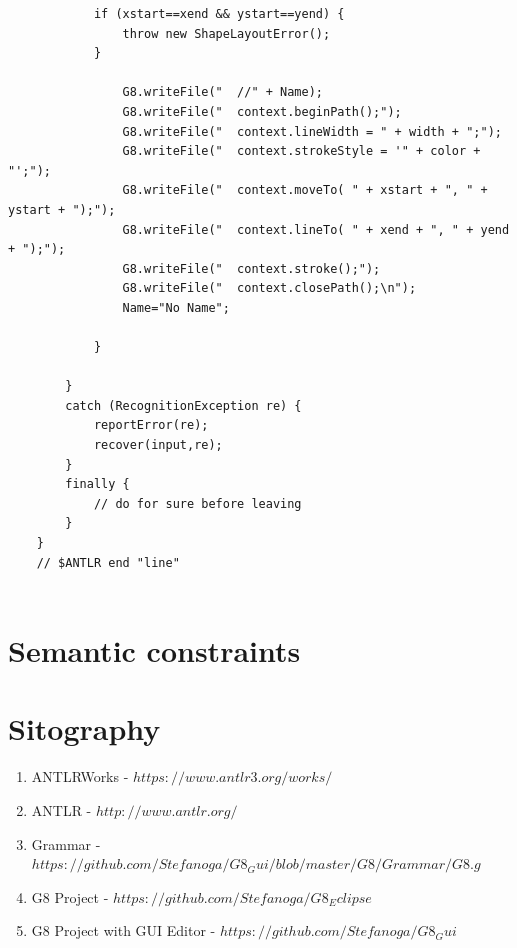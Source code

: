 \documentclass[a4paper]{article}
\begin{document}
\begin{verbatim}
			if (xstart==xend && ystart==yend) {
				throw new ShapeLayoutError();
			}
			
				G8.writeFile("	//" + Name);
				G8.writeFile("	context.beginPath();");
				G8.writeFile("	context.lineWidth = " + width + ";");
				G8.writeFile("	context.strokeStyle = '" + color + "';");
				G8.writeFile("	context.moveTo( " + xstart + ", " + ystart + ");");
				G8.writeFile("	context.lineTo( " + xend + ", " + yend + ");");
				G8.writeFile("	context.stroke();");
				G8.writeFile("	context.closePath();\n");
				Name="No Name";
					
			}

		}
		catch (RecognitionException re) {
			reportError(re);
			recover(input,re);
		}
		finally {
			// do for sure before leaving
		}
	}
	// $ANTLR end "line"
	
\end{verbatim}

\newpage

\section{Semantic constraints}

\newpage

\section{Sitography}

\begin{enumerate}
\item ANTLRWorks -  \href{https://www.antlr3.org/works/}{$https://www.antlr3.org/works/$} 
\item ANTLR - \href{http://www.antlr.org/}{$http://www.antlr.org/$}
\item Grammar - \href{https://github.com/Stefanoga/G8_Gui/blob/master/G8/Grammar/G8.g}{$https://github.com/Stefanoga/G8_Gui/blob/master/G8/Grammar/G8.g$}
\label{grammar}
\item G8 Project - \href{https://github.com/Stefanoga/G8_Eclipse}{$https://github.com/Stefanoga/G8_Eclipse$}
\item G8 Project with GUI Editor - \href{https://github.com/Stefanoga/G8_Gui}{$https://github.com/Stefanoga/G8_Gui$}
\end{enumerate}
\end{document}
